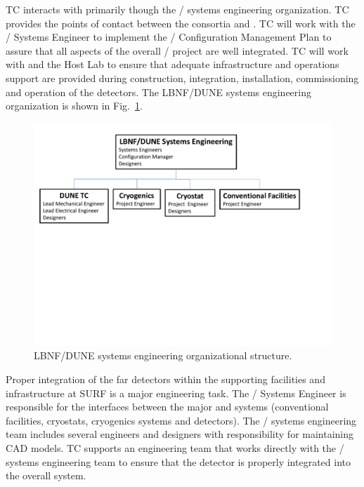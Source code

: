  TC interacts with  primarily though the
/ systems engineering organization. TC
provides the points of contact between the consortia and .
TC will work with the / Systems Engineer to
implement the / Configuration Management Plan
to assure that all aspects of the overall /
project are well integrated. TC will work with  and the
Host Lab to ensure that adequate infrastructure and operations support
are provided during construction, integration, installation,
commissioning and operation of the detectors. The LBNF/DUNE systems
engineering organization is shown in Fig.~\ref{fig:DUNE_SE_org}.
\begin{figure}[htb]
  \begin{center}
    \includegraphics[width=\textwidth]{far-detector-generic/figures/TC_SE_Org_Chart}
    \caption{LBNF/DUNE systems engineering organizational structure.}
    \label{fig:DUNE_SE_org}
  \end{center}
\end{figure}
Proper integration of the far detectors within the supporting
facilities and infrastructure at SURF is a major engineering task.
The / Systems Engineer is responsible for the
interfaces between the major  and  systems
(conventional facilities, cryostats, cryogenics systems and
detectors). The / systems engineering team
includes several engineers and designers with responsibility for
maintaining CAD models.  TC supports an engineering team
that works directly with the / systems
engineering team to ensure that the detector is properly integrated
into the overall system.

